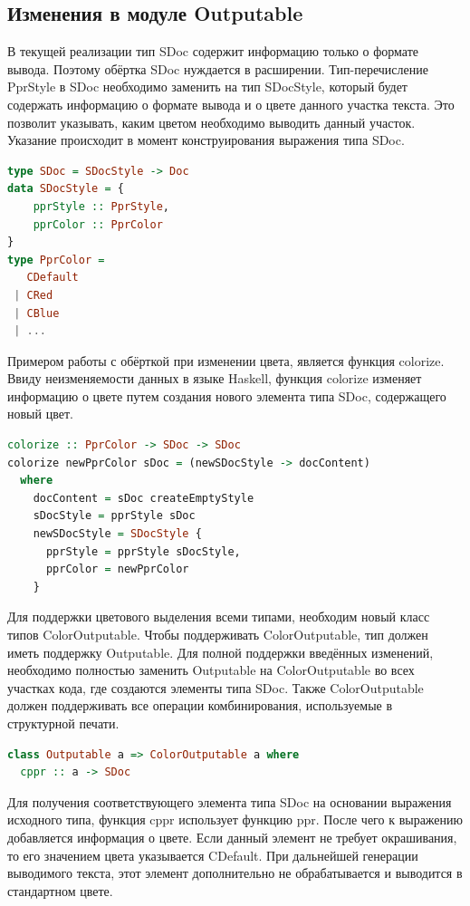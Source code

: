 \subsection{Изменения в модуле Outputable}

В текущей реализации тип SDoc содержит информацию только о формате вывода. Поэтому обёртка SDoc нуждается в расширении. Тип-перечисление PprStyle в SDoc необходимо заменить на тип SDocStyle, который будет содержать информацию о формате вывода и о цвете данного участка текста. Это позволит указывать, каким цветом необходимо выводить данный участок. Указание происходит в момент конструирования выражения типа SDoc.

\begin{lstlisting}[language=Haskell, caption=Дополненная реализация типа SDoc]
type SDoc = SDocStyle -> Doc
data SDocStyle = {
    pprStyle :: PprStyle,
    pprColor :: PprColor
}
type PprColor =
   CDefault
 | CRed
 | CBlue
 | ...
\end{lstlisting}

Примером работы с обёрткой при изменении цвета, является функция colorize. Ввиду неизменяемости данных в языке Haskell, функция colorize изменяет информацию о цвете путем создания нового элемента типа SDoc, содержащего новый цвет.

\begin{lstlisting}[language=Haskell, caption=Пример функции окраски]
colorize :: PprColor -> SDoc -> SDoc
colorize newPprColor sDoc = (newSDocStyle -> docContent)
  where 
    docContent = sDoc createEmptyStyle
    sDocStyle = pprStyle sDoc  
    newSDocStyle = SDocStyle { 
      pprStyle = pprStyle sDocStyle, 
      pprColor = newPprColor 
    }
\end{lstlisting}

Для поддержки цветового выделения всеми типами, необходим новый класс типов ColorOutputable. Чтобы поддерживать ColorOutputable, тип должен иметь поддержку Outputable. Для полной поддержки введённых изменений, необходимо полностью заменить Outputable на ColorOutputable во всех участках кода, где создаются элементы типа SDoc. Также ColorOutputable должен поддерживать все операции комбинирования, используемые в структурной печати.

\begin{lstlisting}[language=Haskell, caption=Класс типов ColorOutputable]
class Outputable a => ColorOutputable a where
  cppr :: a -> SDoc
\end{lstlisting}

Для получения соответствующего элемента типа SDoc на основании выражения исходного типа, функция cppr использует функцию ppr. После чего к выражению добавляется информация о цвете. Если данный элемент не требует окрашивания, то его значением цвета указывается CDefault. При дальнейшей генерации выводимого текста, этот элемент дополнительно не обрабатывается и выводится в стандартном цвете.

